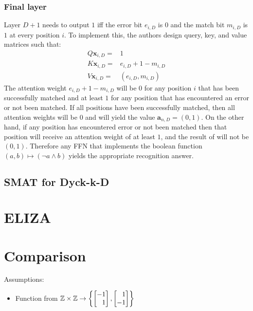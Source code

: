 \subsubsection{Final layer}
Layer $D + 1$ needs to output $1$ iff the error bit $e_{i,D}$ is $0$ and the match bit $m_{i,D}$ is $1$ at every position $i$. To implement this, the authors design query, key, and value matrices such that:\begin{align*}
    Q\mathbf{x}_{i,D} = & 1 \\
    K\mathbf{x}_{i,D} = & e_{i,D}+1-m_{i,D}\\
    V\mathbf{x}_{i,D} = & (e_{i,D},m_{i,D})
\end{align*}
The attention weight $e_{i,D}+1-m_{i,D}$ will be $0$ for any position $i$ that has been successfully matched and at least $1$ for any position that has encountered an error or not been matched. If all positions have been successfully matched, then all attention weights will be $0$ and \UHAT{} will yield the value $\mathbf{a}_{n,D}=(0,1)$. On the other hand, if any position has encountered error or not been matched then that position will receive an attention weight of at least $1$, and the result of \UHAT{} will not be $(0,1)$. Therefore any FFN that implements the boolean function $(a,b) \mapsto (\neg a \land b)$ yields the appropriate recognition answer.

\subsection{SMAT for Dyck-k-D}



\section{ELIZA}


\section{Comparison}
\label{sec:assembly_comparison}


Assumptions:
\begin{itemize}
    \item Function from $\Z\times\Z\to \left\{\begin{bmatrix}
                  -1 \\\phantom- 1
              \end{bmatrix}, \begin{bmatrix}
                  \phantom- 1 \\-1
              \end{bmatrix}\right\}$
\end{itemize}

